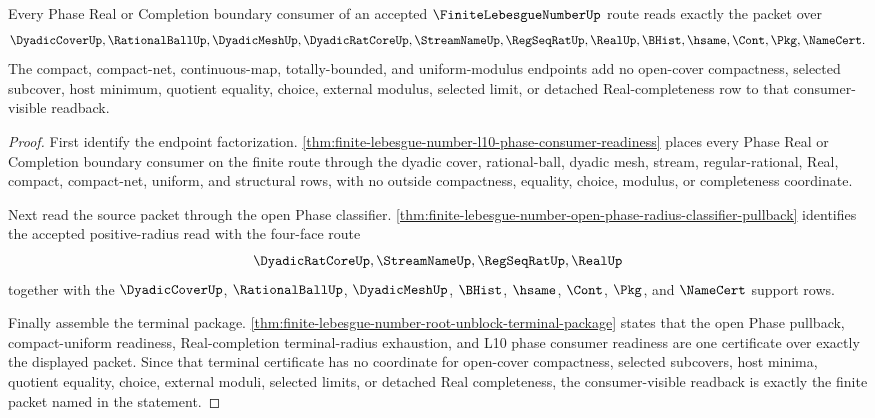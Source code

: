 \begin{theorem}
\label{thm:finite-lebesgue-number-l10-consumer-readback-exactness}
Every Phase Real or Completion boundary consumer of an accepted $\FiniteLebesgueNumberUp$ route reads exactly the packet over
$$
\DyadicCoverUp,\RationalBallUp,\DyadicMeshUp,\DyadicRatCoreUp,\StreamNameUp,\RegSeqRatUp,\RealUp,\BHist,\hsame,\Cont,\Pkg,\NameCert .
$$
The compact, compact-net, continuous-map, totally-bounded, and uniform-modulus endpoints add no open-cover compactness, selected subcover, host minimum, quotient equality, choice, external modulus, selected limit, or detached Real-completeness row to that consumer-visible readback.
\end{theorem}
\begin{proof}
First identify the endpoint factorization. \autoref{thm:finite-lebesgue-number-l10-phase-consumer-readiness} places every Phase Real or Completion boundary consumer on the finite route through the dyadic cover, rational-ball, dyadic mesh, stream, regular-rational, Real, compact, compact-net, uniform, and structural rows, with no outside compactness, equality, choice, modulus, or completeness coordinate.

Next read the source packet through the open Phase classifier. \autoref{thm:finite-lebesgue-number-open-phase-radius-classifier-pullback} identifies the accepted positive-radius read with the four-face route
$$
\DyadicRatCoreUp,\StreamNameUp,\RegSeqRatUp,\RealUp
$$
together with the $\DyadicCoverUp$, $\RationalBallUp$, $\DyadicMeshUp$, $\BHist$, $\hsame$, $\Cont$, $\Pkg$, and $\NameCert$ support rows.

Finally assemble the terminal package. \autoref{thm:finite-lebesgue-number-root-unblock-terminal-package} states that the open Phase pullback, compact-uniform readiness, Real-completion terminal-radius exhaustion, and L10 phase consumer readiness are one certificate over exactly the displayed packet. Since that terminal certificate has no coordinate for open-cover compactness, selected subcovers, host minima, quotient equality, choice, external moduli, selected limits, or detached Real completeness, the consumer-visible readback is exactly the finite packet named in the statement.
\end{proof}
